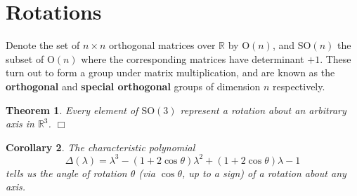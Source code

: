 \documentclass[letter-paper]{tufte-book}
\newtheorem{theorem}{\color{pastel-blue}Theorem}[section]
\newtheorem{corollary}[theorem]{\color{pastel-blue}Corollary}
\newcommand{\qedwhite}{\hfill \ensuremath{\Box}}
\begin{document}

\section{Rotations}

Denote the set of $n\times n$ orthogonal matrices over $\mathbb{R}$ by
$\mbox{O}(n)$, and $\mbox{SO}(n)$ the subset of $\mbox{O}(n)$ where the
corresponding matrices have determinant $+1$. These turn out to form a group
under matrix multiplication, and are known as the \textbf{orthogonal} and
\textbf{special orthogonal} groups of dimension $n$
respectively.

\begin{theorem}
  Every element of $\mbox{SO}(3)$ represent a rotation about an arbitrary axis
  in $\mathbb{R}^3$. \qedwhite
\end{theorem}

\begin{corollary}
  The characteristic polynomial
  \begin{equation*}
    \Delta(\lambda) = \lambda^3 - (1+2\cos\theta)\lambda^2 + (1+2\cos\theta)\lambda - 1
  \end{equation*}
  tells us the angle of rotation $\theta$ (via $\cos\theta$, up to a sign) of a
  rotation about any axis.
\end{corollary}
\end{document}
